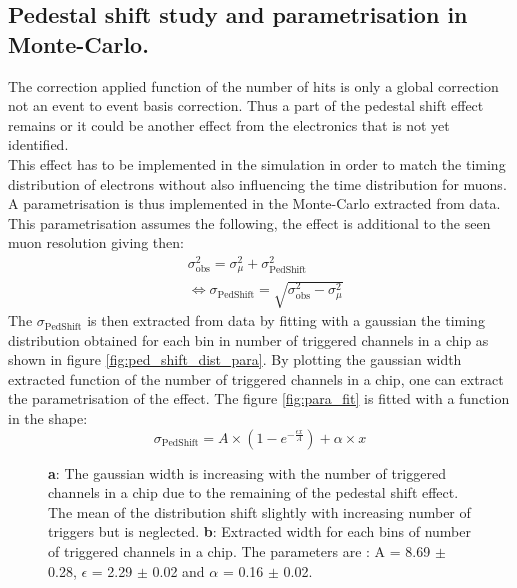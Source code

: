 \documentclass[twoside,a4paper,11pt]{article}
\begin{document}
\begin{appendix}
\newpage
\section{Pedestal shift study and parametrisation in Monte-Carlo.}
\label{appendix:ped_shift}

The correction applied function of the number of hits is only a global correction not an event to event basis correction. Thus a part of the pedestal shift effect remains or it could be another effect from the electronics that is not yet identified.\\
This effect has to be implemented in the simulation in order to match the timing distribution of electrons without also influencing the time distribution for muons. A parametrisation is thus implemented in the Monte-Carlo extracted from data. This parametrisation assumes the following, the effect is additional to the seen muon resolution giving then:
\begin{equation*}
\begin{split}
& \sigma_{\text{obs}}^2 = \sigma_{\mu}^2 + \sigma_{\text{PedShift}}^2 \\
& \Leftrightarrow \sigma_{\text{PedShift}} = \sqrt{\sigma_{\text{obs}}^2 - \sigma_{\mu}^2}
\end{split}
\end{equation*}
The $\sigma_{\text{PedShift}}$ is then extracted from data by fitting with a gaussian the timing distribution obtained for each bin in number of triggered channels in a chip as shown in figure \ref{fig:ped_shift_dist_para}. By plotting the gaussian width extracted function of the number of triggered channels in a chip, one can extract the parametrisation of the effect. The figure \ref{fig:para_fit} is fitted with a function in the shape:
\begin{equation*}
\sigma_{\text{PedShift}} = A \times ( 1 - e^{-\frac{\epsilon x}{A}} ) + \alpha \times x
\end{equation*}
\begin{figure}[htbp]
	\caption[]{\textbf{a}: The gaussian width is increasing with the number of triggered channels in a chip due to the remaining of the pedestal shift effect. The mean of the distribution shift slightly with increasing number of triggers but is neglected. \textbf{b}: Extracted width for each bins of number of triggered channels in a chip. The parameters are : A = 8.69 $\pm$ 0.28, $\epsilon$ = 2.29 $\pm$ 0.02 and $\alpha$ = 0.16 $\pm$ 0.02.}

\end{figure}
\end{appendix}
\end{document}
